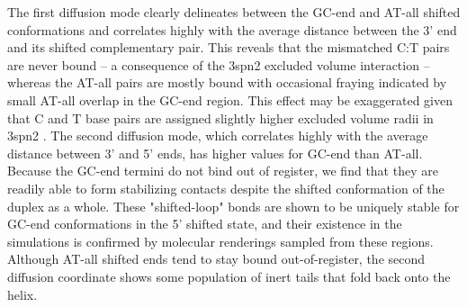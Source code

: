 \documentclass[journal=jpcbfk,manuscript=article]{achemso}
\begin{document}
The first diffusion mode clearly delineates between the GC-end and AT-all shifted conformations and correlates highly with the average distance between the 3' end and its shifted complementary pair. This reveals that the mismatched C:T pairs are never bound -- a consequence of the 3spn2 excluded volume interaction -- whereas the AT-all pairs are mostly bound with occasional fraying indicated by small AT-all overlap in the GC-end region. This effect may be exaggerated given that C and T base pairs are assigned slightly higher excluded volume radii in 3spn2 \citep{Hinckley2013AnHybridization}. The second diffusion mode, which correlates highly with the average distance between 3' and 5' ends, has higher values for GC-end than AT-all. Because the GC-end termini do not bind out of register, we find that they are readily able to form stabilizing contacts despite the shifted conformation of the duplex as a whole. These "shifted-loop" bonds are shown to be uniquely stable for GC-end conformations in the 5' shifted state, and their existence in the simulations is confirmed by molecular renderings sampled from these regions. Although AT-all shifted ends tend to stay bound out-of-register, the second diffusion coordinate shows some population of inert tails that fold back onto the helix. 


\end{document}

